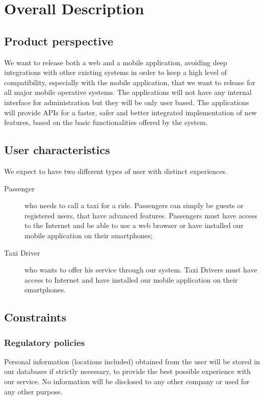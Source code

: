 \section{Overall Description}
	\subsection{Product perspective}
		We want to release both a web and a mobile application, avoiding deep
		integrations with other existing systems in order to keep a high level
		of compatibility, especially with the mobile application, that we want to
		release for all major mobile operative systems. The applications will not
		have any internal interface for administration but they will be only user based.
		The applications will provide APIs for a faster, safer and better integrated 
		implementation of new features, based on the basic functionalities
		offered by the system.
	\subsection{User characteristics}
		We expect to have two different types of user with distinct experiences. 
		\begin{description}
			\item[Passenger] who needs to call a taxi for a ride. Passengers can simply be guests
			or registered users, that have advanced features.
			Passengers must have access to the Internet and be able to use
			a web browser or have installed our mobile application on their smartphones;
			\item[Taxi Driver] who wants to offer his service through our system.
			Taxi Drivers must have access to Internet and have installed our mobile
			application on their smartphones.
		\end{description}
	\subsection{Constraints}
		\subsubsection{Regulatory policies}
			Personal information (locations included) obtained from the	user will be stored
			in our databases if strictly necessary, to provide the best possible experience
			with our service. No information will be disclosed to any other company or
			used for any other purpose.
